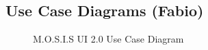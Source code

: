 \subsection{Use Case Diagrams (Fabio)}
\begin{figure}[ht!]
	\caption{M.O.S.I.S UI 2.0 Use Case Diagram}
\end{figure}